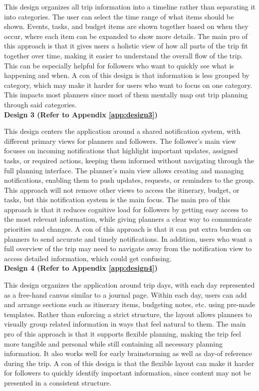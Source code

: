 \documentclass[12pt,a4paper]{article}
\begin{document}
This design organizes all trip information into a timeline rather than separating it into categories. The user can select the time range of what items should be shown. Events, tasks, and budget items are shown together based on when they occur, where each item can be expanded to show more details. The main pro of this approach is that it gives users a holistic view of how all parts of the trip fit together over time, making it easier to understand the overall flow of the trip. This can be especially helpful for followers who want to quickly see what is happening and when. A con of this design is that information is less grouped by category, which may make it harder for users who want to focus on one category. This impacts most planners since most of them mentally map out trip planning through said categories. 
\\

\textbf{Design 3 (Refer to Appendix \ref{app:design3})}

This design centers the application around a shared notification system, with different primary views for planners and followers. The follower’s main view focuses on incoming notifications that highlight important updates, assigned tasks, or required actions, keeping them informed without navigating through the full planning interface. The planner’s main view allows creating and managing notifications, enabling them to push updates, requests, or reminders to the group. This approach will not remove other views to access the itinerary, budget, or tasks, but this notification system is the main focus. The main pro of this approach is that it reduces cognitive load for followers by getting easy access to the most relevant information, while giving planners a clear way to communicate priorities and changes. A con of this approach is that it can put extra burden on planners to send accurate and timely notifications. In addition, users who want a full overview of the trip may need to navigate away from the notification view to access detailed information, which could get confusing. 
\\

\textbf{Design 4 (Refer to Appendix \ref{app:design4})}

This design organizes the application around trip days, with each day represented as a free-hand canvas similar to a journal page. Within each day, users can add and arrange sections such as itinerary items, budgeting notes, etc. using pre-made templates. Rather than enforcing a strict structure, the layout allows planners to visually group related information in ways that feel natural to them. The main pro of this approach is that it supports flexible planning, making the trip feel more tangible and personal while still containing all necessary planning information. It also works well for early brainstorming as well as day-of reference during the trip. A con of this design is that the flexible layout can make it harder for followers to quickly identify important information, since content may not be presented in a consistent structure.
\\
\end{document}
